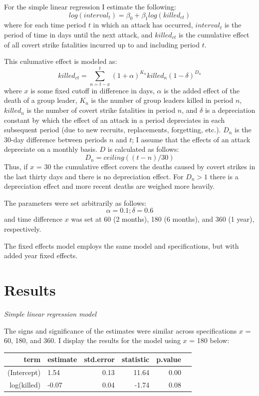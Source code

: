 \documentclass[letterpaper,12pt]{article}
\theoremstyle{definition}
\begin{document}
For the simple linear regression I estimate the following:
\[log\left(interval_t\right) = \beta_0 + \beta_1log\left(killed_{ct}\right) \]
where for each time period $t$ in which an attack has occurred, $interval_{t}$ is the period of time in days until the next attack, and $killed_{ct}$ is the cumulative effect of all covert strike fatalities incurred up to and including period $t$.

This culumative effect is modeled as:
$$killed_{ct} = \sum_{n=t-x}^{t} (1 + \alpha)^{K_n}killed_{n}(1-\delta)^{D_{n}}$$
where $x$ is some fixed cutoff in difference in days, $\alpha$ is the added effect of the death of a group leader, $K_{n}$ is the number of group leaders killed in period $n$, $killed_{n}$ is the number of covert strike fatalities in period $n$, and $\delta$ is a depreciation constant by which the effect of an attack in a period depreciates in each subsequent period (due to new recruits, replacements, forgetting, etc.). $D_{n}$ is the 30-day difference between periods $n$ and $t$; I assume that the effects of an attack depreciate on a monthly basis. $D$ is calculated as follows:
$$D_{n} = ceiling((t - n)/30)$$
Thus, if $x$ = 30 the cumulative effect covers the deaths caused by covert strikes in the last thirty days and there is no depreciation effect. For $D_{n} > 1$ there is a depreciation effect and more recent deaths are weighed more heavily.

The parameters were set arbitrarily as follows: 
$$\alpha = 0.1; \delta = 0.6$$
and time difference $x$ was set at 60 (2 months), 180 (6 months), and 360 (1 year), respectively.

The fixed effects model employs the same model and specifications, but with added year fixed effects.

\section{Results}
\noindent\textit{Simple linear regression model}

The signs and significance of the estimates were similar across specifications $x$ = 60, 180, and 360. I display the results for the model using $x$ = 180 below:

\begin{table}[!htb]
\centering
\begin{tabular}{rlrrrr}
  \hline
term & estimate & std.error & statistic & p.value \\ 
  \hline
(Intercept) & 1.54 & 0.13 & 11.64 & 0.00 \\ 
log(killed) & -0.07 & 0.04 & -1.74 & 0.08 \\ 
   \hline
\end{tabular}
\end{table}
\end{document}
